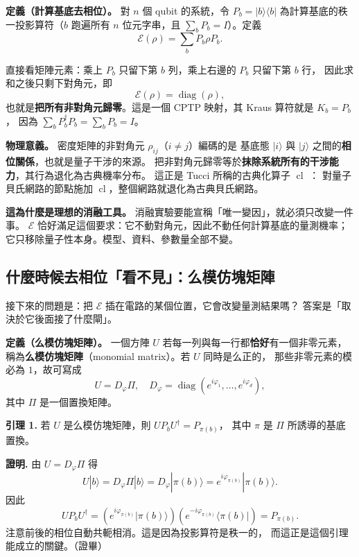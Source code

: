 \documentclass[11pt,a4paper]{ctexart}
\begin{document}
\textbf{定義（計算基底去相位）。} 對 \(n\) 個 qubit 的系統，令
\(P_{b} = |b\rangle\langle b|\) 為計算基底的秩一投影算符（\(b\) 跑遍所有
\(n\) 位元字串，且 \(\sum_{b}P_{b} = I\)）。定義
\[\mathcal{E}(\rho) = \sum_{b}P_{b}\rho P_{b}.\]

直接看矩陣元素：乘上 \(P_{b}\) 只留下第 \(b\) 列，乘上右邊的 \(P_{b}\)
只留下第 \(b\) 行， 因此求和之後只剩下對角元，即
\[\mathcal{E}(\rho) = \operatorname{diag}(\rho),\]
也就是\textbf{把所有非對角元歸零}。這是一個 CPTP 映射，其 Kraus 算符就是
\(K_{b} = P_{b}\)， 因為
\(\sum_{b}P_{b}^{\dagger}P_{b} = \sum_{b}P_{b} = I\)。

\textbf{物理意義。} 密度矩陣的非對角元
\(\rho_{ij}\)（\(i \neq j\)）編碼的是 基底態 \(|i\rangle\) 與
\(|j\rangle\) 之間的\textbf{相位關係}，也就是量子干涉的來源。
把非對角元歸零等於\textbf{抹除系統所有的干涉能力}，其行為退化為古典機率分布。
這正是 Tucci 所稱的古典化算子 \(\operatorname{cl}\) \cite{tucci2012}：
對量子貝氏網路的節點施加
\(\operatorname{cl}\)，整個網路就退化為古典貝氏網路。

\textbf{這為什麼是理想的消融工具。}
消融實驗要能宣稱「唯一變因」，就必須只改變一件事。 \(\mathcal{E}\)
恰好滿足這個要求：它不動對角元，因此不動任何計算基底的量測機率；
它只移除量子性本身。模型、資料、參數量全部不變。

\subsection{什麼時候去相位「看不見」：么模仿塊矩陣}

接下來的問題是：把 \(\mathcal{E}\)
插在電路的某個位置，它會改變量測結果嗎？
答案是「取決於它後面接了什麼閘」。

\textbf{定義（么模仿塊矩陣）。} 一個方陣 \(U\)
若每一列與每一行都\textbf{恰好}有一個非零元素，
稱為\textbf{么模仿塊矩陣}（monomial matrix）。若 \(U\) 同時是么正的，
那些非零元素的模必為 \(1\)，故可寫成
\[U = D_{\varphi}\Pi,\quad D_{\varphi} = \operatorname{diag}(e^{i\varphi_{1}},\ldots,e^{i\varphi_{d}}),\]
其中 \(\Pi\) 是一個置換矩陣。

\textbf{引理 1.} 若 \(U\) 是么模仿塊矩陣，則
\(UP_{b}U^{\dagger} = P_{\pi(b)}\)， 其中 \(\pi\) 是 \(\Pi\)
所誘導的基底置換。

\textbf{證明.} 由 \(U = D_{\varphi}\Pi\) 得
\[U|b\rangle = D_{\varphi}\Pi|b\rangle = D_{\varphi}|\pi(b)\rangle = e^{i\varphi_{\pi(b)}}|\pi(b)\rangle.\]
因此
\[UP_{b}U^{\dagger} = \left( e^{i\varphi_{\pi(b)}}|\pi(b)\rangle \right)\left( e^{- i\varphi_{\pi(b)}}\langle\pi(b)| \right) = P_{\pi(b)}.\]
注意前後的相位自動共軛相消。這是因為投影算符是秩一的，
而這正是這個引理能成立的關鍵。（證畢）
\end{document}
